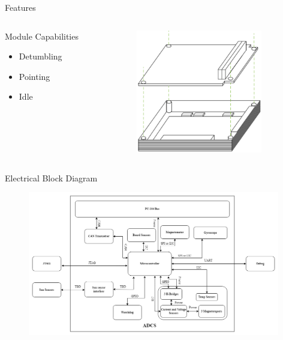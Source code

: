 \documentclass{beamer}
\begin{document}
\begin{frame}{Features}
    \begin{columns}[t]
        \begin{column}[t]{0.5\textwidth}
        \item Module Capabilities
        \vspace{0.3cm}
            \begin{itemize}
                \item Detumbling
                \vspace{0.3cm}
                \item Pointing
                \vspace{0.3cm}
                \item Idle
                \vspace{0.3cm}
            \end{itemize}
        \end{column}
        \begin{column}[t]{0.5\textwidth}
            \begin{figure}[!ht]
                \begin{center}
                    \includegraphics[width=5.5cm]{figures/adcs-module-idea.png}
                \end{center}
            \end{figure}
        \end{column}
    \end{columns}
\end{frame}

\begin{frame}{Electrical Block Diagram}

    \begin{figure}[!ht]
        \begin{center}
            \includegraphics[width=11cm]{figures/ADCS.drawio (3).png}
        \end{center}
    \end{figure}

\end{frame}
\end{document}
